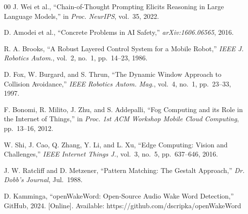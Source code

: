 \documentclass[conference]{IEEEtran}
\begin{document}
\begin{thebibliography}{00}
J. Wei et al.,
``Chain-of-Thought Prompting Elicits Reasoning in Large Language Models,''
in \textit{Proc. NeurIPS}, vol.~35, 2022.

D. Amodei et al.,
``Concrete Problems in AI Safety,'' \textit{arXiv:1606.06565}, 2016.

R. A. Brooks,
``A Robust Layered Control System for a Mobile Robot,''
\textit{IEEE J. Robotics Autom.}, vol.~2, no.~1, pp.~14--23, 1986.

D. Fox, W. Burgard, and S. Thrun,
``The Dynamic Window Approach to Collision Avoidance,''
\textit{IEEE Robotics Autom. Mag.}, vol.~4, no.~1, pp.~23--33, 1997.

F. Bonomi, R. Milito, J. Zhu, and S. Addepalli,
``Fog Computing and its Role in the Internet of Things,''
in \textit{Proc. 1st ACM Workshop Mobile Cloud Computing}, pp.~13--16, 2012.

W. Shi, J. Cao, Q. Zhang, Y. Li, and L. Xu,
``Edge Computing: Vision and Challenges,''
\textit{IEEE Internet Things J.}, vol.~3, no.~5, pp.~637--646, 2016.

J. W. Ratcliff and D. Metzener,
``Pattern Matching: The Gestalt Approach,''
\textit{Dr. Dobb's Journal}, Jul.\ 1988.

D. Kamminga,
``openWakeWord: Open-Source Audio Wake Word Detection,''
GitHub, 2024. [Online]. Available: https://github.com/dscripka/openWakeWord

\end{thebibliography}
\end{document}
